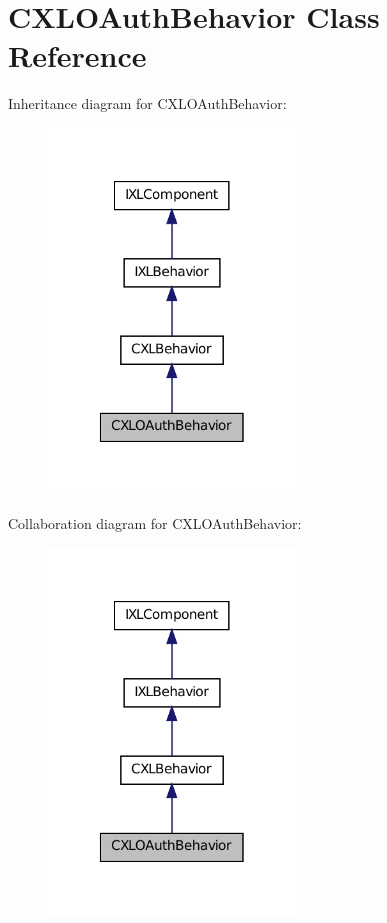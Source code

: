 \hypertarget{classCXLOAuthBehavior}{
\section{CXLOAuthBehavior Class Reference}
\label{classCXLOAuthBehavior}
}


Inheritance diagram for CXLOAuthBehavior:\nopagebreak
\begin{figure}[H]
\begin{center}
\leavevmode
\includegraphics[width=186pt]{classCXLOAuthBehavior__inherit__graph}
\end{center}
\end{figure}


Collaboration diagram for CXLOAuthBehavior:\nopagebreak
\begin{figure}[H]
\begin{center}
\leavevmode
\includegraphics[width=186pt]{classCXLOAuthBehavior__coll__graph}
\end{center}
\end{figure}
